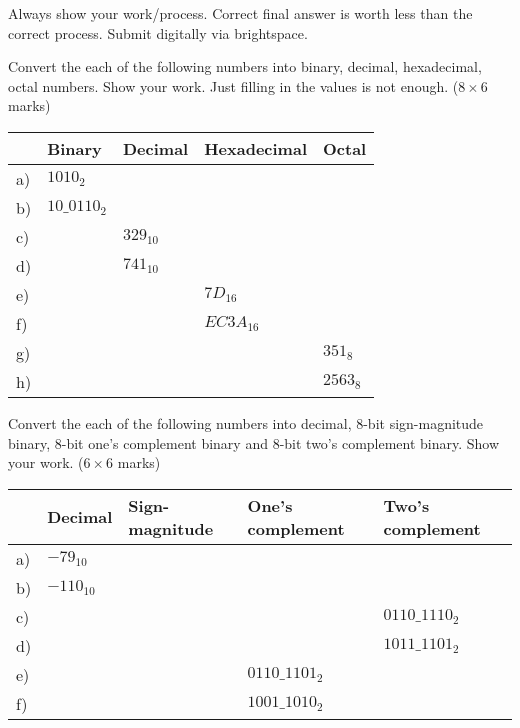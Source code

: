 Always show your work/process. Correct final answer is worth less than the
correct process. Submit digitally via brightspace.

\begin{prob}
  Convert the each of the following numbers into binary, decimal, hexadecimal,
octal numbers. Show your work. Just filling in the values is not enough. ($8 \times 6 $ marks)

  \begin{tabular}{lllll}
    \toprule
     & Binary & Decimal & Hexadecimal & Octal \\
    \midrule
    a)& $1010_2$     &   &   &    \\
    b)& $10\_0110_2$ &   &   &   \\
    c)&   & $329_{10}$   &   &   \\
    d)&   & $741_{10}$   &   &   \\
    e)&   &   & $7D_{16}$    &   \\
    f)&   &   & $EC3A_{16}$  &   \\
    g)&   &   &   & $351_8$\\
    h)&   &   &   & $2563_8$\\
    \bottomrule
  \end{tabular}
\end{prob}

\vspace{20em}

\begin{prob}
  Convert the each of the following numbers into decimal, 8-bit sign-magnitude binary,
  8-bit one's complement binary and 8-bit two's complement binary. Show your work. ($6 \times 6 $ marks)

  \begin{tabular}{lllll}
    \toprule
    & Decimal & Sign-magnitude & One's complement & Two's complement \\
    \midrule
    a) & $-79_{10}$ & & & \\
    b) & {\color{red}$-110_{10}$} & & & \\
    c) & & & & $0110\_1110_2$ \\
    d) & &  & & $1011\_1101_2$\\
    e) & & & $0110\_1101_2$&  \\
    f) & &  & $1001\_1010_2$& \\
    \bottomrule
  \end{tabular}
\end{prob}

\vspace{20em}

